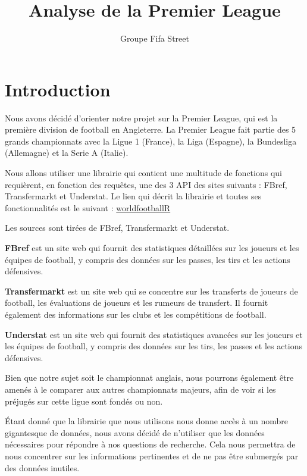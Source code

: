 \documentclass[
]{article}
\title{Analyse de la Premier League}
\author{Groupe Fifa Street}
\date{}
\begin{document}
\maketitle

\hypertarget{introduction}{%
\section{Introduction}\label{introduction}}

Nous avons décidé d'orienter notre projet sur la Premier League, qui est
la première division de football en Angleterre. La Premier League fait
partie des 5 grands championnats avec la Ligue 1 (France), la Liga
(Espagne), la Bundesliga (Allemagne) et la Serie A (Italie).

Nous allons utiliser une librairie qui contient une multitude de
fonctions qui requièrent, en fonction des requêtes, une des 3 API des
sites suivants : FBref, Transfermarkt et Understat. Le lien qui décrit
la librairie et toutes ses fonctionnalités est le suivant :
\href{https://jaseziv.github.io/worldfootballR/articles/extract-fbref-data.html}{worldfootballR}

Les sources sont tirées de FBref, Transfermarkt et Understat.

\textbf{FBref} est un site web qui fournit des statistiques détaillées
sur les joueurs et les équipes de football, y compris des données sur
les passes, les tirs et les actions défensives.

\textbf{Transfermarkt} est un site web qui se concentre sur les
transferts de joueurs de football, les évaluations de joueurs et les
rumeurs de transfert. Il fournit également des informations sur les
clubs et les compétitions de football.

\textbf{Understat} est un site web qui fournit des statistiques avancées
sur les joueurs et les équipes de football, y compris des données sur
les tirs, les passes et les actions défensives.

Bien que notre sujet soit le championnat anglais, nous pourrons
également être amenés à le comparer aux autres championnats majeurs,
afin de voir si les préjugés sur cette ligue sont fondés ou non.

Étant donné que la librairie que nous utilisons nous donne accès à un
nombre gigantesque de données, nous avons décidé de n'utiliser que les
données nécessaires pour répondre à nos questions de recherche. Cela
nous permettra de nous concentrer sur les informations pertinentes et de
ne pas être submergés par des données inutiles.
\end{document}

